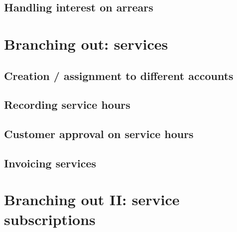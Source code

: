 \section{Handling interest on arrears}
\label{sec-monitoring-interest-on-arrears}



\chapter{Branching out: services}
\label{cha-starting-branch-to-services}

\section{Creation / assignment to different accounts}
\label{sec-starting-services-assignment}

\section{Recording service hours}
\label{sec-starting-services-writing-hours}

\section{Customer approval on service hours}
\label{sec-starting-services-hours-customer-approval}

\section{Invoicing services}
\label{sec-starting-services-invoicing}

\chapter{Branching out II: service subscriptions}
\label{cha-starting-services-subscriptions}

